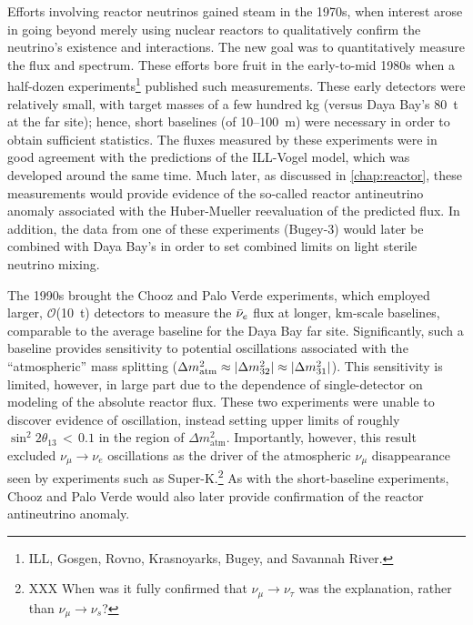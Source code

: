 \documentclass[../thesis.tex]{subfiles}
\begin{document}
Efforts involving reactor neutrinos gained steam in the 1970s, when interest arose in going beyond merely using nuclear reactors to qualitatively confirm the neutrino's existence and interactions. The new goal was to quantitatively measure the flux and spectrum. These efforts bore fruit in the early-to-mid 1980s when a half-dozen experiments\footnote{ILL, Gosgen, Rovno, Krasnoyarks, Bugey, and Savannah River.} published such measurements. These early detectors were relatively small, with target masses of a few hundred kg (versus Daya Bay's 80~t at the far site); hence, short baselines (of 10--100~m) were necessary in order to obtain sufficient statistics. The fluxes measured by these experiments were in good agreement with the predictions of the ILL-Vogel model, which was developed around the same time. Much later, as discussed in \autoref{chap:reactor}, these measurements would provide evidence of the so-called reactor antineutrino anomaly associated with the Huber-Mueller reevaluation of the predicted flux. In addition, the data from one of these experiments (Bugey-3) would later be combined with Daya Bay's in order to set combined limits on light sterile neutrino mixing.

The 1990s brought the Chooz and Palo Verde experiments, which employed larger, $\mathcal{O}$(10~t) detectors to measure the $\bar\nu_e$ flux at longer, km-scale baselines, comparable to the average baseline for the Daya Bay far site. Significantly, such a baseline provides sensitivity to potential oscillations associated with the ``atmospheric'' mass splitting ($\Delta m^2_{\mathrm{atm}} \approx \lvert \Delta m^2_{32}\rvert \approx \lvert \Delta m^2_{31}\rvert$). This sensitivity is limited, however, in large part due to the dependence of single-detector on modeling of the absolute reactor flux. These two experiments were unable to discover evidence of oscillation, instead setting upper limits of roughly $\sin^2 2\theta_{13}\,<\,0.1$ in the region of $\Delta m^2_{\mathrm{atm}}$. Importantly, however, this result excluded $\nu_\mu \rightarrow \nu_e$ oscillations as the driver of the atmospheric $\nu_\mu$ disappearance seen by experiments such as Super-K.\footnote{XXX When was it fully confirmed that $\nu_\mu \rightarrow \nu_\tau$ was the explanation, rather than $\nu_\mu \rightarrow \nu_s$? } As with the short-baseline experiments, Chooz and Palo Verde would also later provide confirmation of the reactor antineutrino anomaly.
\end{document}
